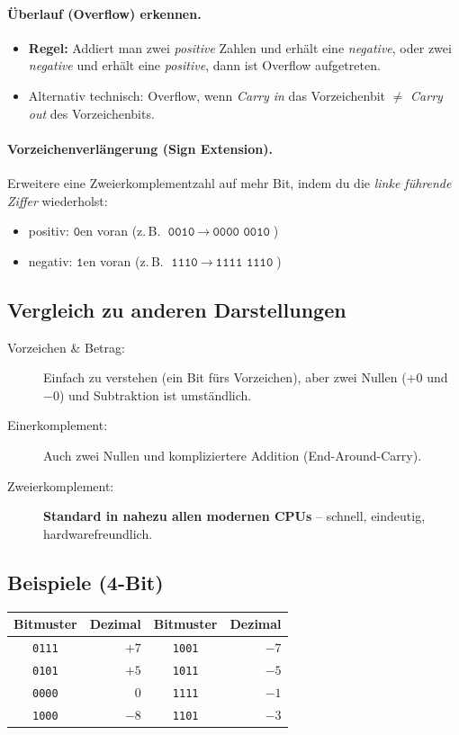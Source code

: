 \documentclass[../skript/main.tex]{subfiles}
\begin{document}
\paragraph{Überlauf (Overflow) erkennen.}
\begin{itemize}
	\item \textbf{Regel:} Addiert man zwei \emph{positive} Zahlen und erhält eine \emph{negative}, oder zwei \emph{negative} und erhält eine \emph{positive}, dann ist Overflow aufgetreten.
	\item Alternativ technisch: Overflow, wenn \emph{Carry in} das Vorzeichenbit \(\neq\) \emph{Carry out} des Vorzeichenbits.
\end{itemize}

\paragraph{Vorzeichenverlängerung (Sign Extension).}
Erweitere eine Zweierkomplementzahl auf mehr Bit, indem du die \emph{linke führende Ziffer} wiederholst:
\begin{itemize}
	\item positiv: \(\texttt{0}\)en voran (z.\,B. \(\texttt{0010}\ \to\ \texttt{0000 0010}\))
	\item negativ: \(\texttt{1}\)en voran (z.\,B. \(\texttt{1110}\ \to\ \texttt{1111 1110}\))
\end{itemize}

\subsection*{Vergleich zu anderen Darstellungen}
\begin{description}
	\item[Vorzeichen \& Betrag:] Einfach zu verstehen (ein Bit fürs Vorzeichen), aber zwei Nullen (\(+0\) und \(-0\)) und Subtraktion ist umständlich.
	\item[Einerkomplement:] Auch zwei Nullen und kompliziertere Addition (End-Around-Carry).
	\item[Zweierkomplement:] \textbf{Standard in nahezu allen modernen CPUs} – schnell, eindeutig, hardwarefreundlich.
\end{description}

\subsection*{Beispiele (4-Bit)}
\begin{center}
	\begin{tabular}{c|r@{\qquad}c|r}
		\textbf{Bitmuster} & \textbf{Dezimal} & \textbf{Bitmuster} & \textbf{Dezimal} \\
		\hline
		\texttt{0111} & $+7$ & \texttt{1001} & $-7$ \\
		\texttt{0101} & $+5$ & \texttt{1011} & $-5$ \\
		\texttt{0000} & $0$  & \texttt{1111} & $-1$ \\
		\texttt{1000} & $-8$ & \texttt{1101} & $-3$ \\
	\end{tabular}
\end{center}
\end{document}
